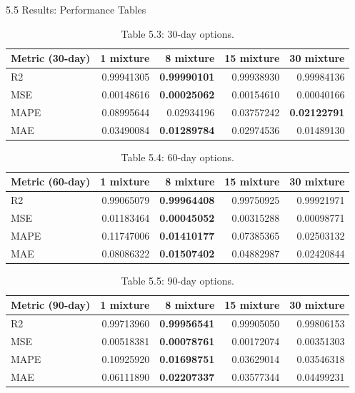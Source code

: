 \documentclass[aspectratio=169,10pt]{beamer}
\begin{document}
\begin{frame}[allowframebreaks]{5.5 Results: Performance Tables}
\framebreak

\begin{table}
\centering
\scriptsize
\begin{tabular}{lrrrr}
\toprule
Metric (30-day) & 1 mixture & 8 mixture & 15 mixture & 30 mixture \\
\midrule
R2   & 0.99941305 & \textbf{0.99990101} & 0.99938930 & 0.99984136 \\
MSE  & 0.00148616 & \textbf{0.00025062} & 0.00154610 & 0.00040166 \\
MAPE & 0.08995644 & 0.02934196 & 0.03757242 & \textbf{0.02122791} \\
MAE  & 0.03490084 & \textbf{0.01289784} & 0.02974536 & 0.01489130 \\
\bottomrule
\end{tabular}
\caption*{Table 5.3: 30-day options.}
\end{table}

\begin{table}
\centering
\scriptsize
\begin{tabular}{lrrrr}
\toprule
Metric (60-day) & 1 mixture & 8 mixture & 15 mixture & 30 mixture \\
\midrule
R2   & 0.99065079 & \textbf{0.99964408} & 0.99750925 & 0.99921971 \\
MSE  & 0.01183464 & \textbf{0.00045052} & 0.00315288 & 0.00098771 \\
MAPE & 0.11747006 & \textbf{0.01410177} & 0.07385365 & 0.02503132 \\
MAE  & 0.08086322 & \textbf{0.01507402} & 0.04882987 & 0.02420844 \\
\bottomrule
\end{tabular}
\caption*{Table 5.4: 60-day options.}
\end{table}

\framebreak

\begin{table}
\centering
\scriptsize
\begin{tabular}{lrrrr}
\toprule
Metric (90-day) & 1 mixture & 8 mixture & 15 mixture & 30 mixture \\
\midrule
R2   & 0.99713960 & \textbf{0.99956541} & 0.99905050 & 0.99806153 \\
MSE  & 0.00518381 & \textbf{0.00078761} & 0.00172074 & 0.00351303 \\
MAPE & 0.10925920 & \textbf{0.01698751} & 0.03629014 & 0.03546318 \\
MAE  & 0.06111890 & \textbf{0.02207337} & 0.03577344 & 0.04499231 \\
\bottomrule
\end{tabular}
\caption*{Table 5.5: 90-day options.}
\end{table}


\end{frame}
\end{document}
